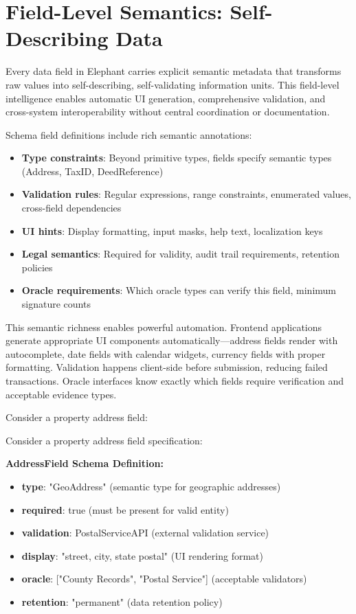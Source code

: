 \section{Field-Level Semantics: Self-Describing Data}

Every data field in Elephant carries explicit semantic metadata that transforms raw values into self-describing, self-validating information units. This field-level intelligence enables automatic UI generation, comprehensive validation, and cross-system interoperability without central coordination or documentation.

Schema field definitions include rich semantic annotations:

\begin{itemize}
\item \textbf{Type constraints}: Beyond primitive types, fields specify semantic types (Address, TaxID, DeedReference)
\item \textbf{Validation rules}: Regular expressions, range constraints, enumerated values, cross-field dependencies
\item \textbf{UI hints}: Display formatting, input masks, help text, localization keys
\item \textbf{Legal semantics}: Required for validity, audit trail requirements, retention policies
\item \textbf{Oracle requirements}: Which oracle types can verify this field, minimum signature counts
\end{itemize}

This semantic richness enables powerful automation. Frontend applications generate appropriate UI components automatically—address fields render with autocomplete, date fields with calendar widgets, currency fields with proper formatting. Validation happens client-side before submission, reducing failed transactions. Oracle interfaces know exactly which fields require verification and acceptable evidence types.

Consider a property address field:

Consider a property address field specification:

\textbf{AddressField Schema Definition:}
\begin{itemize}
\item \textbf{type}: "GeoAddress" (semantic type for geographic addresses)
\item \textbf{required}: true (must be present for valid entity)
\item \textbf{validation}: PostalServiceAPI (external validation service)
\item \textbf{display}: "street, city, state postal" (UI rendering format)
\item \textbf{oracle}: ["County Records", "Postal Service"] (acceptable validators)
\item \textbf{retention}: "permanent" (data retention policy)
\end{itemize}

